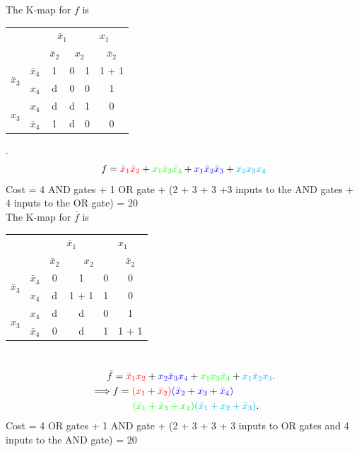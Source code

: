 \documentclass[twocolumn]{article}
\newcommand{\bx}{\bar{x}}
\newcommand{\cred}{\color{red}}
\newcommand{\cg}{\color{green}}
\newcommand{\cb}{\color{blue}}
\begin{document}
The K-map for $f$ is
\\
\begin{tabular}{c|c|c|c|c|c}
  \toprule
  && \multicolumn{2}{c|}{$\bx_1$} & \multicolumn{2}{c}{$x_1$}
  \\
  && $\bx_2$ & \multicolumn{2}{c|}{$x_2$} & $\bx_2$
  \\ \midrule
  \multirow{2}{*}{$\bx_3$} & $\bx_4$
                                  & \cred 1 & 0 & \cg 1 & \cg 1 + \cb 1
  \\
  & $x_4$
                                  & \cred d & 0 & 0 & \cb 1
  \\
  \multirow{2}{*}{$x_3$}   &  $x_4$
                                  & \cred d & \color{cyan} d & \color{cyan} 1 & 0
  \\
  & $\bx_4$
                                  & \cred 1 & d & 0 & 0
  \\\bottomrule
\end{tabular}.
\\
\[ f = { \cred \bx_1 \bx_2 } +  { \cg x_1 \bx_3 \bx_4 } + {\cb x_1 \bx_2 \bx_3 }
  + { \color{cyan} x_2 x_3 x_4 }
\]
  Cost = 4 AND gates + 1 OR gate + (2 + 3 + 3 +3 inputs to the AND gates + 4
  inputs to the OR gate) = 20
  \\
The K-map for $\bar{f}$ is
\\
\begin{tabular}{c|c|c|c|c|c}
  \toprule
  && \multicolumn{2}{c|}{$\bx_1$} & \multicolumn{2}{c}{$x_1$}
  \\
  && $\bx_2$ & \multicolumn{2}{c|}{$x_2$} & $\bx_2$
  \\ \midrule
  \multirow{2}{*}{$\bx_3$} & $\bx_4$
                                  & 0 & \cred 1 & 0 & 0
  \\
  & $x_4$
                                  & d & \cred 1 + \cb  1 & \cb 1 & 0
  \\
  \multirow{2}{*}{$x_3$}   &  $x_4$
                                  & d & \cred d & 0 & \color{cyan} 1
  \\
  & $\bx_4$
                                  & 0 & \cred d & \cg 1 & \cg 1 +  \color{cyan} 1
  \\\bottomrule
\end{tabular}
\\
\begin{align}
  \bar{f} &= { \cred \bx_1 x_2 }  +  { \cb  x_2 \bx_3 x_4 }+  {\cg x_1 x_3 \bx_4
  } + { \color{cyan} x_1 \bx_2 x_3}.
  \\
  \implies &f = { \cred (x_1 + \bx_2) } {\cb (\bx_2 + x_3 + \bx_4) }
  \notag\\
  &\qquad {\cg (\bx_1 + \bx_3 + x_4) }
  {\color{cyan} (\bx_1 + x_2 + \bx_3 )}.
\end{align}
Cost = 4 OR gates + 1 AND gate + (2 + 3 + 3 + 3 inputs to OR gates and 4 inputs
to the AND gate) = 20 
\end{document}
